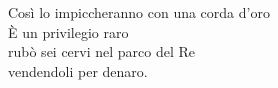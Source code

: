 \documentclass[10pt, twoside, a4paper]{article}
\begin{document}
\begin{multicols}{2}
Cos\`i lo impiccheranno con una corda d'oro\\
\`E un privilegio raro\\
rub\`o sei cervi nel parco del Re\\
vendendoli per denaro.\\

\end{multicols}
\end{document}
